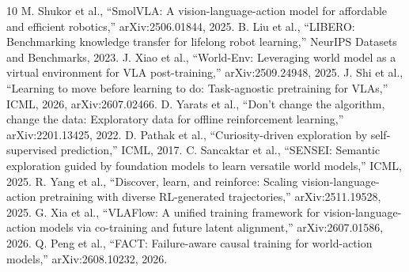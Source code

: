 \documentclass[conference]{IEEEtran}
\begin{document}
\begin{thebibliography}{10}
 M. Shukor et al., ``SmolVLA: A vision-language-action model for affordable and efficient robotics,'' arXiv:2506.01844, 2025.
 B. Liu et al., ``LIBERO: Benchmarking knowledge transfer for lifelong robot learning,'' NeurIPS Datasets and Benchmarks, 2023.
 J. Xiao et al., ``World-Env: Leveraging world model as a virtual environment for VLA post-training,'' arXiv:2509.24948, 2025.
 J. Shi et al., ``Learning to move before learning to do: Task-agnostic pretraining for VLAs,'' ICML, 2026, arXiv:2607.02466.
 D. Yarats et al., ``Don't change the algorithm, change the data: Exploratory data for offline reinforcement learning,'' arXiv:2201.13425, 2022.
 D. Pathak et al., ``Curiosity-driven exploration by self-supervised prediction,'' ICML, 2017.
 C. Sancaktar et al., ``SENSEI: Semantic exploration guided by foundation models to learn versatile world models,'' ICML, 2025.
 R. Yang et al., ``Discover, learn, and reinforce: Scaling vision-language-action pretraining with diverse RL-generated trajectories,'' arXiv:2511.19528, 2025.
 G. Xia et al., ``VLAFlow: A unified training framework for vision-language-action models via co-training and future latent alignment,'' arXiv:2607.01586, 2026.
 Q. Peng et al., ``FACT: Failure-aware causal training for world-action models,'' arXiv:2608.10232, 2026.
\end{thebibliography}
\end{document}
